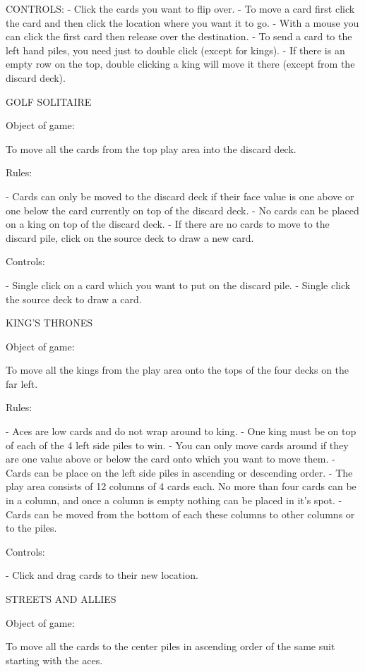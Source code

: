 CONTROLS:
- Click the cards you want to flip over.
- To move a card first click the card and then click the location
where you want it to go.
- With a mouse you can click the first card then release over the
destination.
- To send a card to the left hand piles, you need just to double
click (except for kings).
- If there is an empty row on the top, double clicking a king will
move it there (except from the discard deck). 



GOLF SOLITAIRE

Object of game:

To move all the cards from the top play area into the discard deck.

Rules:

- Cards can only be moved to the discard deck if their face value is
  one above or one below the card currently on top of the discard deck.
- No cards can be placed on a king on top of the discard deck.
- If there are no cards to move to the discard pile, click on the
  source deck to draw a new card.

Controls:

- Single click on a card which you want to put on the discard pile.
- Single click the source deck to draw a card.


KING'S THRONES

Object of game:

To move all the kings from the play area onto the tops of the four decks
on the far left.

Rules:

- Aces are low cards and do not wrap around to king.
- One king must be on top of each of the 4 left side piles to win.
- You can only move cards around if they are one value above or below
  the card onto which you want to move them.
- Cards can be place on the left side piles in ascending or descending 
  order.
- The play area consists of 12 columns of 4 cards each. No more than
  four cards can be in a column, and once a column is empty nothing can
  be placed in it's spot.
- Cards can be moved from the bottom of each these columns to other
  columns or to the piles.

Controls:

- Click and drag cards to their new location.


STREETS AND ALLIES

Object of game:

To move all the cards to the center piles in ascending order of the
same suit starting with the aces.

